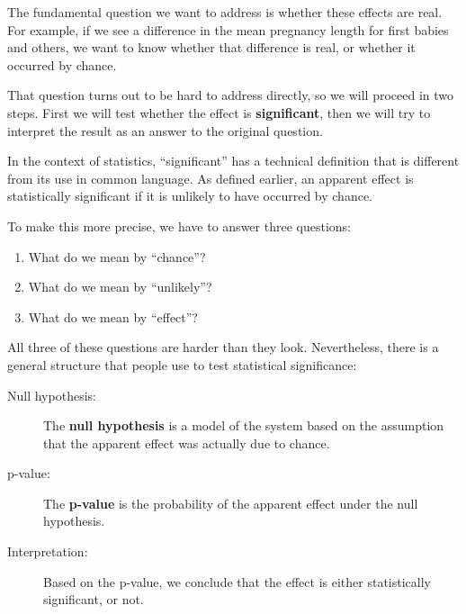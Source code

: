 \documentclass[12pt]{book}
\begin{document}

The fundamental question we want to address is whether these effects
are real.  For example, if we see a difference in the mean pregnancy
length for first babies and others, we want to know whether that
difference is real, or whether it occurred by chance.


That question turns out to be hard to address directly, so we will
proceed in two steps.  First we will test whether the effect is {\bf
  significant}, then we will try to interpret the result
  as an answer to the original question.


In the context of statistics, ``significant'' has a technical
definition that is different from its use in common language.
As defined earlier, an apparent effect is statistically
significant if it is unlikely to have occurred by chance.


To make this more precise, we have to answer three questions:

\begin{enumerate}

\item What do we mean by ``chance''?

\item What do we mean by ``unlikely''?

\item What do we mean by ``effect''?

\end{enumerate}

All three of these questions are harder than they look.  Nevertheless,
there is a general structure that people use to test statistical
significance:

\begin{description}

\item[Null hypothesis:] The {\bf null hypothesis} is a model of the
  system based on the assumption that the apparent effect was actually
  due to chance.


\item[p-value:] The {\bf p-value} is the probability of the apparent
  effect under the null hypothesis.


\item[Interpretation:] Based on the p-value, we conclude that the
  effect is either statistically significant, or not.

\end{description}
\end{document}
